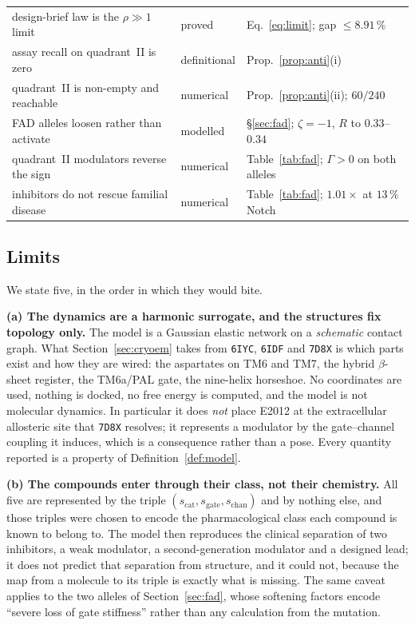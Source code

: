 \documentclass[11pt,reqno]{amsart}
\theoremstyle{plain}
\theoremstyle{definition}
\theoremstyle{remark}
\numberwithin{equation}{section}
\begin{document}
\begin{table}[ht]
\begin{tabular}{@{}l l l@{}}
design-brief law is the $\rho\gg1$ limit & proved & Eq.~\eqref{eq:limit}; gap $\le8.91\,\%$ \\
assay recall on quadrant~II is zero & definitional & Prop.~\ref{prop:anti}(i) \\
quadrant~II is non-empty and reachable & numerical & Prop.~\ref{prop:anti}(ii); $60/240$ \\
FAD alleles loosen rather than activate & modelled & \S\ref{sec:fad}; $\zeta=-1$, $R$ to $0.33$--$0.34$ \\
quadrant~II modulators reverse the sign & numerical & Table~\ref{tab:fad}; $\Gamma>0$ on both alleles \\
inhibitors do not rescue familial disease & numerical & Table~\ref{tab:fad}; $1.01\times$ at $13\,\%$ Notch \\
\bottomrule
\end{tabular}
\end{table}

\subsection{Limits}
We state five, in the order in which they would bite.

\textbf{(a) The dynamics are a harmonic surrogate, and the structures fix topology only.} The model is a Gaussian elastic network on a \emph{schematic} contact graph. What Section~\ref{sec:cryoem} takes from \texttt{6IYC}, \texttt{6IDF} and \texttt{7D8X} is which parts exist and how they are wired: the aspartates on TM6 and TM7, the hybrid $\beta$-sheet register, the TM6a/PAL gate, the nine-helix horseshoe. No coordinates are used, nothing is docked, no free energy is computed, and the model is not molecular dynamics. In particular it does \emph{not} place E2012 at the extracellular allosteric site that \texttt{7D8X} resolves; it represents a modulator by the gate--channel coupling it induces, which is a consequence rather than a pose. Every quantity reported is a property of Definition~\ref{def:model}.

\textbf{(b) The compounds enter through their class, not their chemistry.} All five are represented by the triple $(s_{\mathrm{cat}},s_{\mathrm{gate}},s_{\mathrm{chan}})$ and by nothing else, and those triples were chosen to encode the pharmacological class each compound is known to belong to. The model then reproduces the clinical separation of two inhibitors, a weak modulator, a second-generation modulator and a designed lead; it does not predict that separation from structure, and it could not, because the map from a molecule to its triple is exactly what is missing. The same caveat applies to the two alleles of Section~\ref{sec:fad}, whose softening factors encode ``severe loss of gate stiffness'' rather than any calculation from the mutation.
\end{document}
